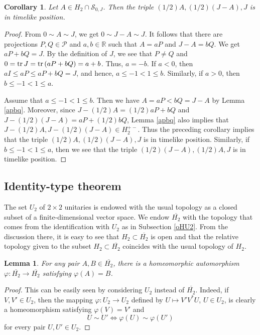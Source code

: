\documentclass[10pt]{amsart}
\newtheorem{lemma}[theorem]{Lemma}
\newtheorem{corollary}[theorem]{Corollary}
\theoremstyle{definition}
\theoremstyle{remark}
\numberwithin{subsection}{section}
\numberwithin{equation}{section}
\newcommand\cP{{\mathcal{P}}}
\newcommand\oH{{\overline{H_2}}}
\begin{document}
\begin{corollary}\label{SJS}
Let $A\in H_2\cap \mathcal{S}_{0, J}$. Then the triple $(1/2)A, (1/2)(J-A), J$ is in timelike position.
\end{corollary}
\begin{proof}
From $0\sim A\sim J$, we get $0\sim J-A\sim J$. 
It follows that there are projections $P, Q\in \cP$ and $a,b\in \mathbb{R}$ such that $A=aP$ and $J-A=bQ$.
We get $aP+bQ=J$. By the definition of $J$, we see that $P\neq Q$ and $0 = {\rm tr}\, J = {\rm tr}\, (aP + bQ) = a+b$. Thus, $a=-b$. If $a < 0$, then $aI \le aP \le aP + bQ = J$, and hence, $a\leq -1<1\leq b$. Similarly, if $a>0$, then $b\leq -1<1\leq a$.

Assume that $a\leq -1<1\leq b$. Then we have $A=aP<bQ=J-A$ by Lemma \ref{apbq}. 
Moreover, since $J-(1/2)A=(1/2)aP+bQ$ and $J-(1/2)(J-A)=aP+(1/2)bQ$, Lemma \ref{apbq} also implies that $J-(1/2)A, J-(1/2)(J-A)\in H_2^{+-}$.
Thus the preceding corollary implies that the triple $(1/2)A, (1/2)(J-A), J$ is in timelike position.
Similarly, if $b\leq -1<1\leq a$, then we see that the triple $(1/2)(J-A), (1/2)A, J$ is in timelike position.
\end{proof}







\subsection{Identity-type theorem}\label{identity-type theorem}
The set $U_2$ of $2\times 2$ unitaries is endowed with the usual topology as a closed subset of a finite-dimensional vector space.   
We endow $\oH$ with the topology that comes from the identification with $U_2$ as in Subsection \ref{oHU2}. 
From the discussion there, it is easy to see that $H_2\subset \oH$ is open and that the relative topology given to the subset $H_2\subset \oH$ coincides with the usual topology of $H_2$.


\begin{lemma}\label{srtsrt}
For any pair $A, B\in \oH$, there is a homeomorphic automorphism $\varphi\colon \oH\to\oH$ satisfying $\varphi(A)=B$.
\end{lemma}
\begin{proof}
This can be easily seen by considering $U_2$ instead of $\oH$. 
Indeed, if $V,V'\in U_2$, then the mapping $\varphi\colon U_2\to U_2$ defined by $U\mapsto V'V^*U$, $U\in U_2$, is clearly a homeomorphism satisfying $\varphi(V)=V'$ and 
\[
U\sim U'\iff \varphi(U)\sim \varphi(U')
\] 
for every pair $U, U'\in U_2$.
\end{proof}
\end{document}
